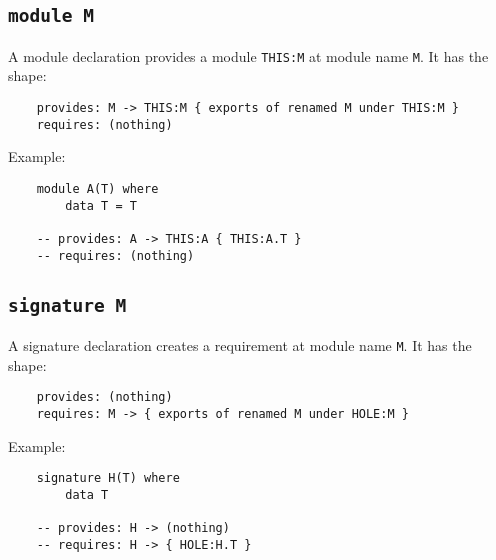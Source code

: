 \documentclass{article}
\begin{document}

\subsection{\texttt{module M}}

A module declaration provides a module \verb|THIS:M| at module name \verb|M|. It
has the shape:

\begin{verbatim}
    provides: M -> THIS:M { exports of renamed M under THIS:M }
    requires: (nothing)
\end{verbatim}
Example:

\begin{verbatim}
    module A(T) where
        data T = T

    -- provides: A -> THIS:A { THIS:A.T }
    -- requires: (nothing)
\end{verbatim}

\newpage
\subsection{\texttt{signature M}}

A signature declaration creates a requirement at module name \verb|M|.  It has the shape:

\begin{verbatim}
    provides: (nothing)
    requires: M -> { exports of renamed M under HOLE:M }
\end{verbatim}

\noindent Example:

\begin{verbatim}
    signature H(T) where
        data T

    -- provides: H -> (nothing)
    -- requires: H -> { HOLE:H.T }
\end{verbatim}
\end{document}
